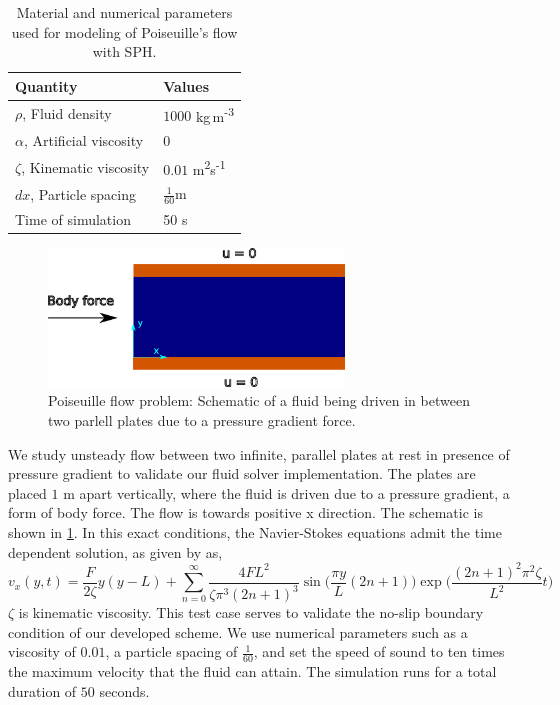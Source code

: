 \documentclass[preprint,12pt]{elsarticle}
\begin{document}
\begin{table}[!ht]
  \centering
  \begin{tabular}[!ht]{ll}
    \toprule
    Quantity & Values\\
    \midrule
    $\rho$, Fluid density & $1000$ kg\,m\textsuperscript{-3} \\
    $\alpha$, Artificial viscosity & $0$ \\
    $\zeta$, Kinematic viscosity & $0.01$ m\textsuperscript{2}s\textsuperscript{-1}\\
    $dx$, Particle spacing & $\frac{1}{60}$m \\
    Time of simulation & 50 s \\
    \bottomrule
  \end{tabular}
  \caption{Material and numerical parameters used for modeling of Poiseuille's
    flow with SPH.}%
  \label{tab:dem_validation_1}
\end{table}
\begin{figure}[!htpb]
  \centering
  \includegraphics[width=0.7\textwidth]{images/fluid_01_benchmark_poisuelle/poiseuille_schematic}
  \caption{Poiseuille flow problem: Schematic of a fluid being driven in
    between two parlell plates due to a pressure gradient force.}
  \label{fig:poiseuille_schematic}
\end{figure}
We study unsteady flow between two infinite, parallel plates at rest in
presence of pressure gradient to validate our fluid solver implementation.
The plates are placed $1$ m apart vertically, where the fluid is driven due to
a pressure gradient, a form of body force. The flow is towards positive x
direction. The schematic is shown in \cref{fig:poiseuille_schematic}.  In this
exact conditions, the Navier-Stokes equations admit the time dependent
solution, as given by \citet{morris1997modeling} as,
\begin{equation}
  \label{eq:poiseuille_exact_soln}
  v_x(y, t) = \frac{F}{2 \zeta}y(y - L) + \sum_{n=0}^{\infty}\frac{4FL^2}{\zeta \pi^3 (2n + 1)^3} \sin\bigg(\frac{\pi y}{L} (2 n + 1) \bigg) \exp\bigg(\frac{ (2 n + 1)^2 \pi^2 \zeta}{L^2} t\bigg)
\end{equation}
$\zeta$ is kinematic viscosity. This test case serves to
validate the no-slip boundary condition of our developed scheme. We use
numerical parameters such as a viscosity of $0.01$, a particle spacing of
$\frac{1}{60}$, and set the speed of sound to ten times the maximum velocity
that the fluid can attain. The simulation runs for a total duration of $50$
seconds.
\end{document}
